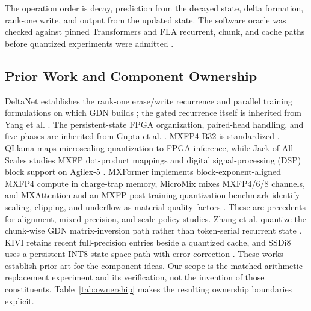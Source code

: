 \documentclass[conference]{IEEEtran}
\begin{document}
The operation order is decay, prediction from the decayed state, delta
formation, rank-one write, and output from the updated state. The software
oracle was checked against pinned Transformers and FLA recurrent, chunk, and
cache paths before quantized experiments were admitted
\cite{transformersqwen,fla021}.

\subsection{Prior Work and Component Ownership}
DeltaNet establishes the rank-one erase/write recurrence and parallel training
formulations on which GDN builds \cite{deltanet}; the gated recurrence itself is
inherited from Yang et al. \cite{gateddeltanet}. The persistent-state FPGA
organization, paired-head handling, and five phases are inherited from Gupta
et al. \cite{gupta2026}. MXFP4-B32 is standardized \cite{ocpmx}. QLlama maps
microscaling quantization to FPGA inference, while Jack of All Scales studies
MXFP dot-product mappings and digital signal-processing (DSP) block support on
Agilex-5 \cite{qllama,jackscales}. MXFormer implements block-exponent-aligned
MXFP4 compute in charge-trap memory, MicroMix mixes MXFP4/6/8 channels, and
MXAttention and an MXFP post-training-quantization benchmark identify scaling,
clipping, and underflow as material quality factors
\cite{mxformer,micromix,mxattention,mxfpbenchmark}. These are precedents for
alignment, mixed precision, and scale-policy studies. Zhang et al. quantize the chunk-wise GDN
matrix-inversion path rather than token-serial recurrent state
\cite{quantgdn}. KIVI retains recent full-precision entries beside a quantized
cache, and SSDi8 uses a persistent INT8 state-space path with error correction
\cite{kivi,ssdi8}. These works establish prior art for the component ideas. Our
scope is the matched arithmetic-replacement experiment and its verification,
not the invention of those constituents.
Table~\ref{tab:ownership} makes the resulting ownership boundaries explicit.
\end{document}
